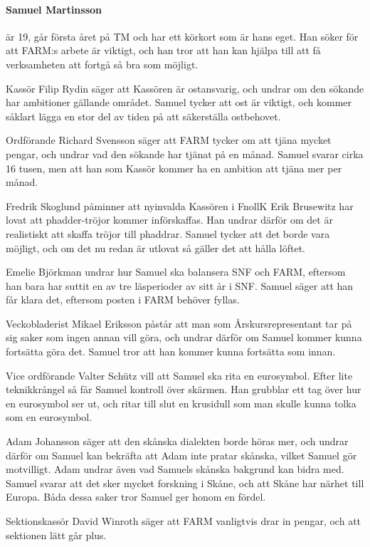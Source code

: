 \documentclass[hidelinks]{sektionsmote}
\begin{document}
\paragraph{Samuel Martinsson} är 19, går första året på TM och har ett körkort som är hans eget.
Han söker för att FARM:s arbete är viktigt, och han tror att han kan hjälpa till att få verksamheten att fortgå så bra som möjligt.\par
Kassör Filip Rydin säger att Kassören är ostansvarig, och undrar om den sökande har ambitioner gällande området.
Samuel tycker att ost är viktigt, och kommer såklart lägga en stor del av tiden på att säkerställa ostbehovet.\par
Ordförande Richard Svensson säger att FARM tycker om att tjäna mycket pengar, och undrar vad den sökande har tjänat på en månad.
Samuel svarar cirka 16 tusen, men att han som Kassör kommer ha en ambition att tjäna mer per månad.\par
Fredrik Skoglund påminner att nyinvalda Kassören i FnollK Erik Brusewitz har lovat att phadder-tröjor kommer införskaffas.
Han undrar därför om det är realistiskt att skaffa tröjor till phaddrar.
Samuel tycker att det borde vara möjligt, och om det nu redan är utlovat så gäller det att hålla löftet.\par
Emelie Björkman undrar hur Samuel ska balansera SNF och FARM, eftersom han bara har suttit en av tre läsperioder av sitt år i SNF.
Samuel säger att han får klara det, eftersom posten i FARM behöver fyllas.\par
Veckobladerist Mikael Eriksson påstår att man som Årskursrepresentant tar på sig saker som ingen annan vill göra, och undrar därför om Samuel kommer kunna fortsätta göra det.
Samuel tror att han kommer kunna fortsätta som innan.\par
Vice ordförande Valter Schütz vill att Samuel ska rita en eurosymbol.
Efter lite teknikkrångel så får Samuel kontroll över skärmen.
Han grubblar ett tag över hur en eurosymbol ser ut, och ritar till slut en krusidull som man skulle kunna tolka som en eurosymbol.\par
Adam Johansson säger att den skånska dialekten borde höras mer, och undrar därför om Samuel kan bekräfta att Adam inte pratar skånska, vilket Samuel gör motvilligt.
Adam undrar även vad Samuels skånska bakgrund kan bidra med.
Samuel svarar att det sker mycket forskning i Skåne, och att Skåne har närhet till Europa.
Båda dessa saker tror Samuel ger honom en fördel.\par
Sektionskassör David Winroth säger att FARM vanligtvis drar in pengar, och att sektionen lätt går plus.
\end{document}

